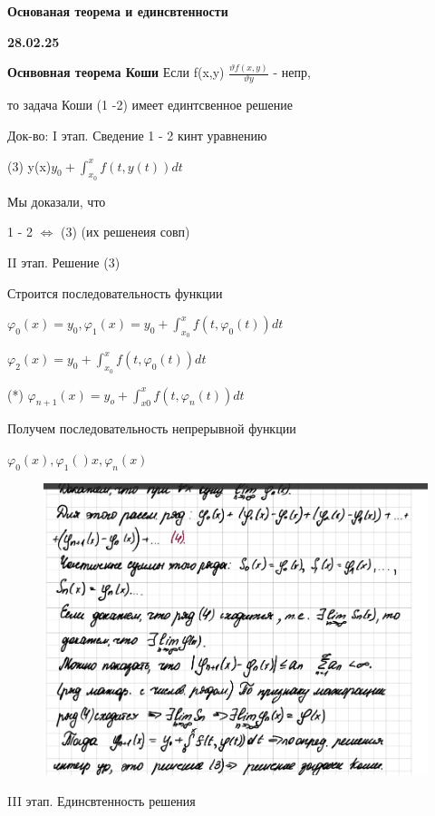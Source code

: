 \documentclass{article}
\begin{document}
\textbf{Основаная теорема и единсвтенности}





\textbf{28.02.25}

\textbf{Оснвовная теорема Коши}
Если f(x,y) $\frac{\vartheta f (x,y)}{\vartheta y}$ - непр,

то задача Коши (1 -2) имеет единтсвенное решение

Док-во: I этап. Сведение 1 - 2 кинт уравнению 

(3) y(x)$y_0 +\int_{x_0}^{x}f(t,y(t))dt$

Мы доказали, что

1 - 2 $\Leftrightarrow $ (3) (их решенеия совп)

II этап. Решение (3)

Строится последовательность функции

$\varphi_0(x) = y_0, \varphi_1(x) = y_0 + \int_{x_0}^{x} f(t, \varphi_0(t))dt$

$\varphi_2(x) = y_0 + \int_{x_0}^{x} f(t, \varphi_0(t))dt$

(*) $\varphi_{n+1}(x) = y_o + \int_{x0}^{x} f(t,\varphi_n(t))dt$

Получем последовательность непрерывной функции

$\varphi_0(x), \varphi_1()x, \varphi_n(x)$


\begin{figure}[H]
    \centering
    \includegraphics[width=1\linewidth]{Снимок экрана 2025-02-28 102203.png}
\end{figure}


III этап. Единсвтенность решения
\end{document}
